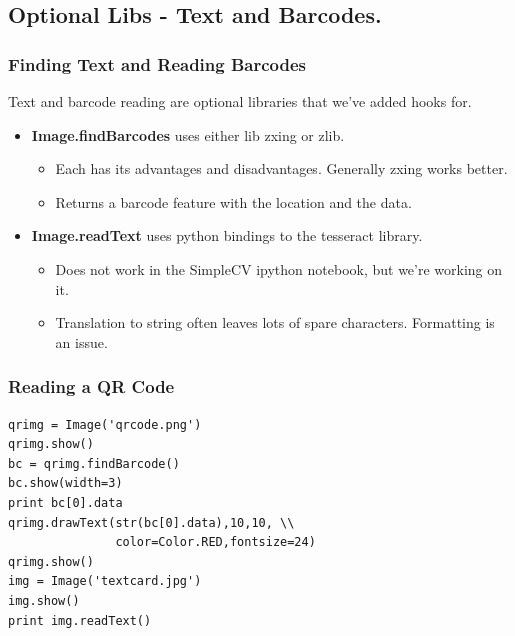 \documentclass{beamer}
\begin{document}
\subsection{Optional Libs - Text and Barcodes.}
\begin{frame}
  \frametitle{Finding Text and Reading Barcodes}
Text and barcode reading are optional libraries that we've added hooks
for. 
\begin{itemize}
\item \textbf{Image.findBarcodes} uses either lib zxing or zlib. 
  \begin{itemize}
    \item Each has its advantages and disadvantages. Generally zxing works better.
    \item Returns a barcode feature with the location and the data. 
  \end{itemize}
\item \textbf{Image.readText} uses python bindings to the tesseract
  library.
  \begin{itemize}
    \item Does not work in the SimpleCV ipython notebook, but we're
      working on it. 
   \item Translation to string often leaves lots of spare
     characters. Formatting is an issue. 
  \end{itemize}
\end{itemize}
\end{frame}
\begin{frame}[fragile] 
\frametitle{Reading a QR Code}
\begin{example}
\begin{verbatim}
qrimg = Image('qrcode.png')
qrimg.show()
bc = qrimg.findBarcode()
bc.show(width=3)
print bc[0].data
qrimg.drawText(str(bc[0].data),10,10, \\
               color=Color.RED,fontsize=24)
qrimg.show()
img = Image('textcard.jpg')
img.show()
print img.readText()
\end{verbatim}
\end{example}
\end{frame} 
\end{document}
